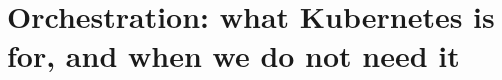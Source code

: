 \chapter{Orchestration: what Kubernetes is for, and when we do not need it}
\label{ch:orchestration-what-kubernetes-is-for}

